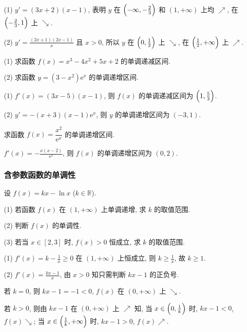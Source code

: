   \beginsolution
    (1) $y'=(3x+2)(x-1)$, 表明 $y$ 在 $\Bigl(-\infty,-\frac23\Bigr)$ 和 $(1,+\infty)$ 上均 $\nearrow$, 在 $\Bigl(-\frac23,1\Bigr)$ 上 $\searrow$.
    
    (2) $y'=\frac{(2x+1)(2x-1)}x$ 且 $x>0$, 
    所以 $y$ 在 $\Bigl(0,\frac12\Bigr)$ 上 $\searrow$, 在 $\Bigl(\frac12,+\infty\Bigr)$ 上 $\nearrow$.
  \endsolution
  
  \lianxi
  \begin{exercise}
    (1) 求函数 $f(x)=x^3 -4x^2 +5x+2$ 的单调递减区间.
    
    (2) 求函数 $y=(3-x^2)\mathrm{e}^x$ 的单调递增区间.
  \end{exercise}

  \beginsolution
    (1) $f'(x)=(3x-5)(x-1)$, 则 $f(x)$ 的单调递减区间为 $\Bigl(1,\frac53\Bigr)$.
    
    (2) $y'=-(x+3)(x-1)\mathrm{e}^x$, 则 $y$ 的单调递增区间为 $(-3,1)$. 
  \endsolution
  
  \begin{exercise}
    求函数 $f(x)= \dfrac{x^2}{\mathrm{e}^x}$ 的单调递增区间.
  \end{exercise}

  \beginsolution
    $f'(x)=-\frac{x(x-2)}{\mathrm{e}^x}$, 则 $f(x)$ 的单调递增区间为 $(0,2)$.
  \endsolution
  
  \subsubsection{含参数函数的单调性}
  \begin{example}
    设 $f(x)=kx-\ln x$ ($k\in\mathbb{R}$).
    
    (1) 若函数 $f(x)$ 在 $(1,+\infty)$ 上单调递增, 求 $k$ 的取值范围.
    
    (2) 判断 $f(x)$ 的单调性.
    
    (3) 若当 $x\in[2,3]$ 时, $f(x)>0$ 恒成立, 求 $k$ 的取值范围. 
  \end{example}

  \beginsolution
    (1) $f'(x)=k-\frac1x\geqslant 0$ 在 $(1,+\infty)$ 上恒成立, 则 $k\geqslant \frac1x$, 故 $k\geqslant 1$.
    
    (2) $f'(x)=\frac{kx-1}x$, 由 $x>0$ 知只需判断 $kx-1$ 的正负号.
    
    若 $k=0$, 则 $kx-1=-1<0$, $f(x)$ 在 $(0,+\infty)$ 上 $\searrow$.
    
    若 $k>0$, 则由 $kx-1$ 在 $(0,+\infty)$ 上 $\nearrow$ 知, 
    当 $x\in\Bigl(0,\frac1k\Bigr)$ 时, $kx-1<0$, $f(x)\searrow$; 当 $x\in\Bigl(\frac1k,+\infty\Bigr)$ 时, $kx-1>0$, $f(x)\nearrow$.

